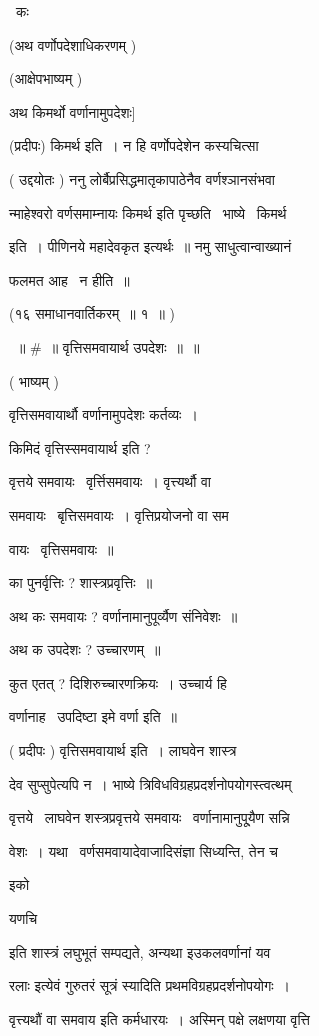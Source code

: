 \documentclass[11pt, openany]{book}
\begin{document}
 \textendash\ कः 

(अथ वर्णोपदेशाधिकरणम् ) 

(आक्षेपभाष्यम् ) 

अथ किमर्थो वर्णानामुपदेशः] 

(प्रदीपः) किमर्थ इति~। न हि वर्णोपदेशेन कस्यचित्सा \textendash\ 

( उद्दयोतः ) ननु लोर्बैप्रसिद्धमातृकापाठेनैव वर्णश्ञानसंभवा \textendash\ 

न्माहेश्वरो वर्णसमाम्नायः किमर्थ इति पृच्छति \textendash\ भाष्ये \textendash\ किमर्थ 

इति~। पीणिनये महादेवकृत इत्यर्थः~॥ नमु साधुत्वान्वाख्यानं 

फलमत आह \textendash\ न हीति~॥ 

(१६ समाधानवार्तिकरम्~॥ १~॥ ) 

~॥ \#~॥ वृत्तिसमवायार्थ उपदेशः~॥~॥ 

( भाष्यम् ) 

वृत्तिसमवायार्थौ वर्णानामुपदेशः कर्तव्यः~। 

किमिदं वृत्तिस्समवायार्थ इति ? 

वृत्तये समवायः \textendash\ वृर्त्तिसमवायः~। वृत्त्यर्थौ वा 

समवायः \textendash\ बृत्तिसमवायः~। वृत्तिप्रयोजनो वा सम \textendash\ 

वायः \textendash\ वृत्तिसमवायः~॥ 

का पुनर्वृत्तिः ? शास्त्रप्रवृत्तिः~॥ 

अथ कः समवायः ? वर्णानामानुपूर्व्यैण संनिवेशः~॥ 

अथ क उपदेशः ? उच्चारणम्~॥ 

कुत एतत् ? दिशिरुच्चारणक्रियः~। उच्चार्य हि 

वर्णानाह \textendash\ उपदिष्टा इमे वर्णा इति~॥ 

( प्रदीपः ) वृत्तिसमवायार्थ इति~। लाघवेन शास्त्र \textendash\ 



देव सुप्सुपेत्यपि न~। भाष्ये त्रिविधविग्रहप्रदर्शनोपयोगस्त्वत्थम् \textendash\ 

वृत्तये \textendash\ लाघवेन शस्त्रप्रवृत्तये समवायः \textendash\ वर्णानामानुपू्यैण सन्नि \textendash\ 

वेशः~। यथा \textendash\ वर्णसमवायादेवाजादिसंज्ञा सिध्यन्ति, तेन च {\qt इको 

यणचि} इति शास्त्रं लघुभूतं सम्पद्यते, अन्यथा {\qt इउकलवर्णानां यव} \textendash\ 

रलाः इत्येवं गुरुतरं सूत्रं स्यादिति प्रथमविग्रहप्रदर्शनोपयोगः~। 

वृत्त्यथौं वा समवाय इति कर्मधारयः~। अस्मिन् पक्षे लक्षणया वृत्ति \textendash\ 
\end{document}
